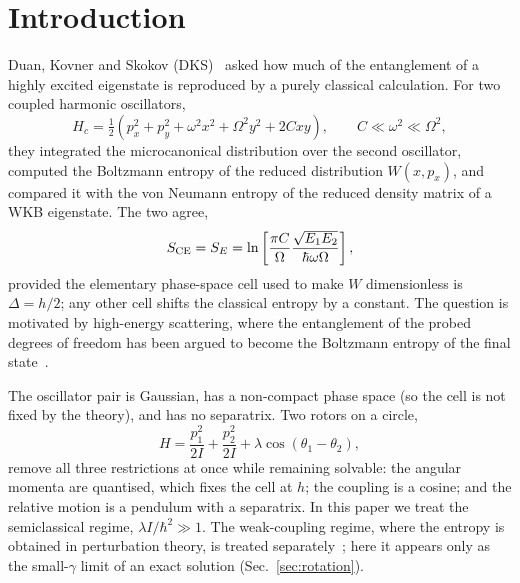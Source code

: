 \documentclass[preprint,12pt]{elsarticle}
\begin{document}
\tableofcontents
\newpage

\section{Introduction}
\label{sec:intro}

Duan, Kovner and Skokov (DKS)~\cite{DKS} asked how much of the entanglement of
a highly excited eigenstate is reproduced by a purely classical calculation.
For two coupled harmonic oscillators,
\begin{equation}
H_{c}=\tfrac12\left(p_{x}^{2}+p_{y}^{2}+\omega^{2}x^{2}+\Omega^{2}y^{2}
+2Cxy\right),\qquad C\ll\omega^{2}\ll\Omega^{2},
\label{eq:DKS}
\end{equation}
they integrated the microcanonical distribution over the second oscillator,
computed the Boltzmann entropy of the reduced distribution $W(x,p_{x})$, and
compared it with the von Neumann entropy of the reduced density matrix of a
WKB eigenstate. The two agree,
\begin{equation}
S_{\rm CE}=S_{E}=\ln\left[\frac{\pi C}{\Omega}
\frac{\sqrt{E_{1}E_{2}}}{\hbar\omega\Omega}\right],
\label{eq:DKSresult}
\end{equation}
provided the elementary phase-space cell used to make $W$ dimensionless is
$\Delta=h/2$; any other cell shifts the classical entropy by a constant. The
question is motivated by high-energy scattering, where the entanglement of the
probed degrees of freedom has been argued to become the Boltzmann entropy of
the final state~\cite{KharzeevLevin,Kutak,Hagiwara}.

The oscillator pair is Gaussian, has a non-compact phase space (so the cell is
not fixed by the theory), and has no separatrix. Two rotors on a circle,
\begin{equation}
H=\frac{p_{1}^{2}}{2I}+\frac{p_{2}^{2}}{2I}
+\lambda\cos\left(\theta_{1}-\theta_{2}\right),
\label{eq:H}
\end{equation}
remove all three restrictions at once while remaining solvable: the angular
momenta are quantised, which fixes the cell at $h$; the coupling is a cosine;
and the relative motion is a pendulum with a separatrix. In this paper we
treat the semiclassical regime, $\lambda I/\hbar^{2}\gg1$. The weak-coupling
regime, where the entropy is obtained in perturbation theory, is treated
separately~\cite{companion}; here it appears only as the small-$\gamma$ limit of
an exact solution (Sec.~\ref{sec:rotation}).
\end{document}
